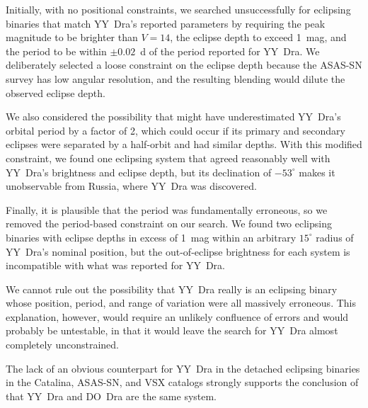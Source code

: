 \documentclass[twocolumn]{aastex63}
\begin{document}
Initially, with no positional constraints, we searched unsuccessfully for eclipsing binaries that match YY~Dra's reported parameters by requiring the peak magnitude to be brighter than $V=14$, the eclipse depth to exceed 1~mag, and the period to be within $\pm0.02$~d of the period reported for YY~Dra. We deliberately selected a loose constraint on the eclipse depth because the ASAS-SN survey has low angular resolution, and the resulting blending would dilute the observed eclipse depth.

We also considered the possibility that \citet{tsesevich} might have underestimated YY~Dra's orbital period by a factor of 2, which could occur if its primary and secondary eclipses were separated by a half-orbit and had similar depths. With this modified constraint,  we found one eclipsing system that agreed reasonably well with YY~Dra's brightness and eclipse depth, but its declination of $-53^{\circ}$ makes it unobservable from Russia, where YY~Dra was discovered.

Finally, it is plausible that the \citet{tsesevich} period was fundamentally erroneous, so we removed the period-based constraint on our search. We found two eclipsing binaries with eclipse depths in excess of 1~mag within an arbitrary $15^{\circ}$ radius of YY~Dra's nominal position, but the out-of-eclipse brightness for each system is incompatible with what was reported for YY~Dra. 

We cannot rule out the possibility that YY~Dra really is an eclipsing binary whose position, period, and range of variation were all massively erroneous. This explanation, however, would require an unlikely confluence of errors and would probably be untestable, in that it would leave the search for YY~Dra almost completely unconstrained.

The lack of an obvious counterpart for YY~Dra in the detached eclipsing binaries in the Catalina, ASAS-SN, and VSX catalogs strongly supports the conclusion of \citet{patterson87} that YY~Dra and DO~Dra are the same system.


\end{document}
